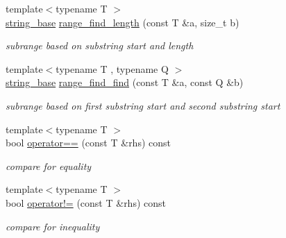\begin{DoxyCompactItemize}
\mbox{\label{classhwlib_1_1string__base_a213b3f368a90aa47ad8eb2f59ebbbfba}} 
{\footnotesize template$<$typename T $>$ }\\\hyperlink{classhwlib_1_1string__base}{string\+\_\+base} \hyperlink{classhwlib_1_1string__base_a213b3f368a90aa47ad8eb2f59ebbbfba}{range\+\_\+find\+\_\+length} (const T \&a, size\+\_\+t b)
\begin{DoxyCompactList}\small\item\em subrange based on substring start and length \end{DoxyCompactList}\item 
\mbox{\label{classhwlib_1_1string__base_a62700672aec60942c3f2d05c0f4cc9d5}} 
{\footnotesize template$<$typename T , typename Q $>$ }\\\hyperlink{classhwlib_1_1string__base}{string\+\_\+base} \hyperlink{classhwlib_1_1string__base_a62700672aec60942c3f2d05c0f4cc9d5}{range\+\_\+find\+\_\+find} (const T \&a, const Q \&b)
\begin{DoxyCompactList}\small\item\em subrange based on first substring start and second substring start \end{DoxyCompactList}\item 
\mbox{\label{classhwlib_1_1string__base_a12faebe47ba54099eba3b79dc77d4962}} 
{\footnotesize template$<$typename T $>$ }\\bool \hyperlink{classhwlib_1_1string__base_a12faebe47ba54099eba3b79dc77d4962}{operator==} (const T \&rhs) const
\begin{DoxyCompactList}\small\item\em compare for equality \end{DoxyCompactList}\item 
\mbox{\label{classhwlib_1_1string__base_ad6fa3f03c516a43b677c91f3424022b0}} 
{\footnotesize template$<$typename T $>$ }\\bool \hyperlink{classhwlib_1_1string__base_ad6fa3f03c516a43b677c91f3424022b0}{operator!=} (const T \&rhs) const
\begin{DoxyCompactList}\small\item\em compare for inequality \end{DoxyCompactList}\item 

\end{DoxyCompactItemize}
